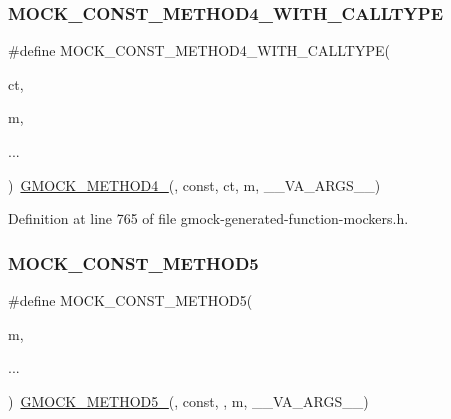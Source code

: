 \subsubsection{\texorpdfstring{M\+O\+C\+K\+\_\+\+C\+O\+N\+S\+T\+\_\+\+M\+E\+T\+H\+O\+D4\+\_\+\+W\+I\+T\+H\+\_\+\+C\+A\+L\+L\+T\+Y\+PE}{MOCK\_CONST\_METHOD4\_WITH\_CALLTYPE}}
{\footnotesize\ttfamily \#define M\+O\+C\+K\+\_\+\+C\+O\+N\+S\+T\+\_\+\+M\+E\+T\+H\+O\+D4\+\_\+\+W\+I\+T\+H\+\_\+\+C\+A\+L\+L\+T\+Y\+PE(\begin{DoxyParamCaption}\item[{}]{ct,  }\item[{}]{m,  }\item[{}]{... }\end{DoxyParamCaption})~\hyperlink{gmock-generated-function-mockers_8h_ab6430f2cfad9de4aca5258ea559294bb}{G\+M\+O\+C\+K\+\_\+\+M\+E\+T\+H\+O\+D4\+\_\+}(, const, ct, m, \+\_\+\+\_\+\+V\+A\+\_\+\+A\+R\+G\+S\+\_\+\+\_\+)}



Definition at line 765 of file gmock-\/generated-\/function-\/mockers.\+h.

\mbox{\label{gmock-generated-function-mockers_8h_ab7021ec2b869e7c9ea90363ee675f19b}} 
\subsubsection{\texorpdfstring{M\+O\+C\+K\+\_\+\+C\+O\+N\+S\+T\+\_\+\+M\+E\+T\+H\+O\+D5}{MOCK\_CONST\_METHOD5}}
{\footnotesize\ttfamily \#define M\+O\+C\+K\+\_\+\+C\+O\+N\+S\+T\+\_\+\+M\+E\+T\+H\+O\+D5(\begin{DoxyParamCaption}\item[{}]{m,  }\item[{}]{... }\end{DoxyParamCaption})~\hyperlink{gmock-generated-function-mockers_8h_a9e3ecd392499ab19a4a6d3adcabf56f6}{G\+M\+O\+C\+K\+\_\+\+M\+E\+T\+H\+O\+D5\+\_\+}(, const, , m, \+\_\+\+\_\+\+V\+A\+\_\+\+A\+R\+G\+S\+\_\+\+\_\+)}



